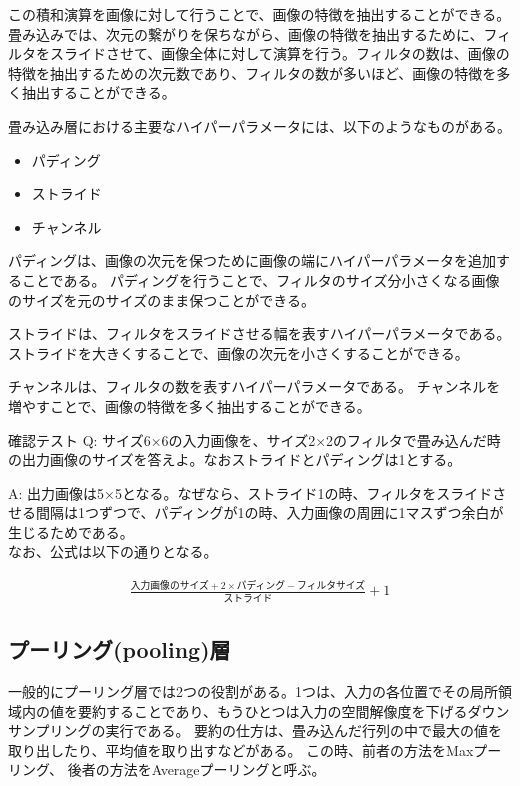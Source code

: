 \documentclass{ltjsarticle}
\begin{document}
\par
この積和演算を画像に対して行うことで、画像の特徴を抽出することができる。
畳み込みでは、次元の繋がりを保ちながら、画像の特徴を抽出するために、フィルタをスライドさせて、画像全体に対して演算を行う。フィルタの数は、画像の特徴を抽出するための次元数であり、フィルタの数が多いほど、画像の特徴を多く抽出することができる。
\par
畳み込み層における主要なハイパーパラメータには、以下のようなものがある。
\begin{itemize}
  \item パディング
  \item ストライド
  \item チャンネル
\end{itemize}
\par
パディングは、画像の次元を保つために画像の端にハイパーパラメータを追加することである。
パディングを行うことで、フィルタのサイズ分小さくなる画像のサイズを元のサイズのまま保つことができる。
\par
ストライドは、フィルタをスライドさせる幅を表すハイパーパラメータである。
ストライドを大きくすることで、画像の次元を小さくすることができる。
\par
チャンネルは、フィルタの数を表すハイパーパラメータである。
チャンネルを増やすことで、画像の特徴を多く抽出することができる。



\begin{itembox}[l]{確認テスト}
  Q: サイズ6×6の入力画像を、サイズ2×2のフィルタで畳み込んだ時の出力画像のサイズを答えよ。なおストライドとパディングは1とする。
 
  A: 出力画像は5×5となる。なぜなら、ストライド1の時、フィルタをスライドさせる間隔は1つずつで、パディングが1の時、入力画像の周囲に1マスずつ余白が生じるためである。\\
  なお、公式は以下の通りとなる。

  \begin{align}
    \frac{{\text{入力画像のサイズ}} + 2 \times \text{パディング} - \text{フィルタサイズ}}{{\text{ストライド}}} + 1
  \end{align}
 
\end{itembox}

\subsection{プーリング(pooling)層}
一般的にプーリング層では2つの役割がある。1つは、入力の各位置でその局所領域内の値を要約することであり、もうひとつは入力の空間解像度を下げるダウンサンプリングの実行である。
要約の仕方は、畳み込んだ行列の中で最大の値を取り出したり、平均値を取り出すなどがある。
この時、前者の方法をMaxプーリング、 後者の方法をAverageプーリングと呼ぶ。
\end{document}
